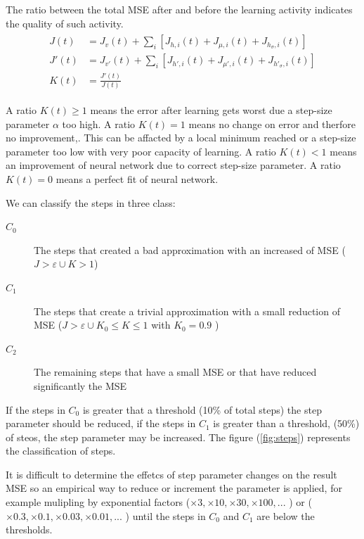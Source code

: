 \documentclass[]{article}
\begin{document}
The ratio between the total MSE after and before the learning activity indicates the quality of such activity.
\begin{align}
\begin{split}
	J(t)&		= J_v(t) + \sum_i [J_{h, i}(t) + J_{\mu, i}(t)+ J_{h_\sigma, i}(t)]
	\\
	J'(t)&	= J_{v'}(t) + \sum_i [J_{h', i}(t) + J_{\mu', i}(t)+ J_{h'_\sigma, i}(t)]
	\\
	K(t)&	= \frac{J'(t)}{J(t)}
\end{split}
\end{align}

A ratio $ K(t) \ge 1 $ means the error after learning gets worst due a step-size parameter $ \alpha $ too high.
A ratio $ K(t) = 1 $  means no change on error and therfore no improvement,. This can be affacted by a local minimum reached or a step-size parameter too low with very poor capacity of learning.
A ratio $ K(t) < 1 $ means an improvement of neural network due to correct step-size parameter.
A ratio $ K(t) = 0 $ means a perfect fit of neural network.

We can classify the steps in three class:
\begin{description}

	\item[$ C_0 $]
	The steps that created a bad approximation with an increased of MSE ($ J > \varepsilon \cup K > 1$)

	\item[$ C_1 $]
	The steps that create a trivial approximation with a small reduction of MSE ($ J > \varepsilon \cup K_0 \le K \le 1 $ with $ K_0 = 0.9$ )

	\item[$ C_2 $]
	The remaining steps that have a small MSE or that have reduced significantly the MSE
\end{description}

If the steps in $ C_0 $ is greater that a threshold (10\% of total steps) the step parameter should be reduced, if the steps in $ C_1 $ is greater than a threshold, (50\%) of steos, the step parameter may be increased.
The figure (\ref{fig:steps}) represents the classification of steps.

It is difficult to determine the effetcs of step parameter changes on the result MSE so an empirical way to reduce or increment the parameter is applied, for example mulipling by exponential factors  ($ \times 3, \times 10, \times 30, \times 100, ...$ ) or ($ \times 0.3, \times 0.1, \times 0.03, \times 0.01, ...$ ) until the steps in $ C_0 $ and $ C_1 $ are below the thresholds.
\end{document}
